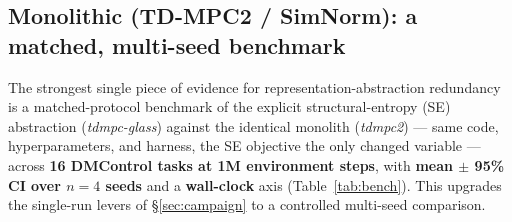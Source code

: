 
\subsection{Monolithic (TD-MPC2 / SimNorm): a matched, multi-seed benchmark}
\label{sec:benchmark}

The strongest single piece of evidence for representation-abstraction redundancy is a
matched-protocol benchmark of the explicit structural-entropy (SE) abstraction
(\emph{tdmpc-glass}) against the identical monolith (\emph{tdmpc2}) --- same code,
hyperparameters, and harness, the SE objective the only changed variable --- across
\textbf{16 DMControl tasks at 1M environment steps}, with \textbf{mean $\pm$ 95\% CI over $n{=}4$
seeds} and a \textbf{wall-clock} axis (Table~\ref{tab:bench}). This upgrades the single-run levers
of \S\ref{sec:campaign} to a controlled multi-seed comparison.

